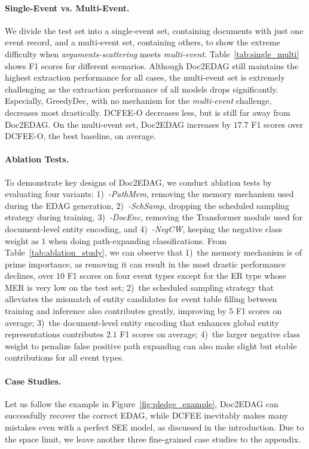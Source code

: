 \documentclass[11pt,a4paper]{article}
\begin{document}
\paragraph{Single-Event vs. Multi-Event.}
We divide the test set into a single-event set, containing documents with just one event record, and a multi-event set, containing others, to show the extreme difficulty when \textit{arguments-scattering} meets \textit{multi-event}.
Table~\ref{tab:single_multi} shows F1 scores for different scenarios.
Although Doc2EDAG still maintains the highest extraction performance for all cases,
the multi-event set is extremely challenging as the extraction performance of all models drops significantly.
Especially, GreedyDec, with no mechanism for the \textit{multi-event} challenge, decreases most drastically.
DCFEE-O decreases less, but is still far away from Doc2EDAG.
On the multi-event set, Doc2EDAG increases by $17.7$ F1 scores over DCFEE-O, the best baseline, on average.

\paragraph{Ablation Tests.}
To demonstrate key designs of Doc2EDAG,
we conduct ablation tests by evaluating four variants:
1)~\textit{-PathMem}, removing the memory mechanism used during the EDAG generation,
2)~\textit{-SchSamp}, dropping the scheduled sampling strategy during training,
3)~\textit{-DocEnc}, removing the Transformer module used for document-level entity encoding,
and 4)~\textit{-NegCW}, keeping the negative class weight as $1$ when doing path-expanding classifications.
From Table~\ref{tab:ablation_study}, we can observe that
1)~the memory mechanism is of prime importance, as removing it can result in the most drastic performance declines, over $10$ F1 scores on four event types except for the ER type whose MER is very low on the test set;
2)~the scheduled sampling strategy that alleviates the mismatch of entity candidates for event table filling between training and inference also contributes greatly, improving by $5$ F1 scores on average;
3)~the document-level entity encoding that enhances global entity representations contributes $2.1$ F1 scores on average;
4)~the larger negative class weight to penalize false positive path expanding can also make slight but stable contributions for all event types.

\paragraph{Case Studies.}
Let us follow the example in Figure~\ref{fig:pledge_example}, Doc2EDAG can successfully recover the correct EDAG, while DCFEE inevitably makes many mistakes even with a perfect SEE model, as discussed in the introduction.
Due to the space limit, we leave another three fine-grained case studies to the appendix.
\end{document}
